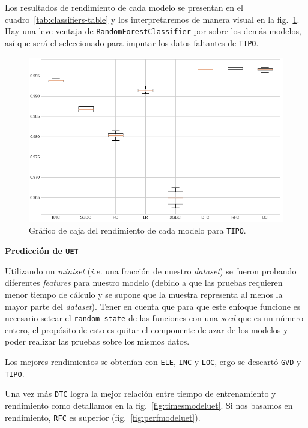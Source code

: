 \documentclass[a4paper,12pt]{article}
\begin{document}
Los resultados de rendimiento de cada modelo se presentan en el cuadro~\ref{tab:classifiers-table} y los interpretaremos de manera visual en la fig.~\ref{fig:boxplotmodeltype}. Hay una leve ventaja de \texttt{RandomForestClassifier} por sobre los demás modelos, así que será el seleccionado para imputar los datos faltantes de \texttt{TIPO}.

\begin{figure}[H]
	\begin{center}
	\includegraphics[width=1\textwidth]{tipoperf.png}
  	\caption{Gráfico de caja del rendimiento de cada modelo para \texttt{TIPO}.}
  	\label{fig:boxplotmodeltype}
  	\end{center}
\end{figure}

\textbf{Predicción de \texttt{UET}}

Utilizando un \textit{miniset} (\textit{i.e.} una fracción de nuestro \textit{dataset}) se fueron probando diferentes \textit{features} para nuestro modelo (debido a que las pruebas requieren menor tiempo de cálculo y se supone que la muestra representa al menos la mayor parte del \textit{dataset}). Tener en cuenta que para que este enfoque funcione es necesario setear el \texttt{random-state} de las funciones con una \textit{seed} que es un número entero, el propósito de esto es quitar el componente de azar de los modelos y poder realizar las pruebas sobre los mismos datos.

Los mejores rendimientos se obtenían con \texttt{ELE}, \texttt{INC} y \texttt{LOC}, ergo se descartó \texttt{GVD} y \texttt{TIPO}.

Una vez más \texttt{DTC} logra la mejor relación entre tiempo de entrenamiento y rendimiento como detallamos en la fig.~\ref{fig:timesmodeluet}. Si nos basamos en rendimiento, \texttt{RFC} es superior (fig.~\ref{fig:perfmodeluet}).
\end{document}
